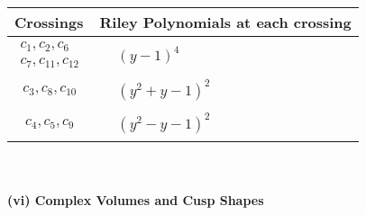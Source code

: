 \documentclass[1p]{elsarticle_modified}
\theoremstyle{definition}
\begin{document}
\begin{tabular}{m{50pt}|m{274pt}}
Crossings & \hspace{64pt}Riley Polynomials at each crossing \\
\hline $$\begin{aligned}c_{1},c_{2},c_{6}\\c_{7},c_{11},c_{12}\end{aligned}$$&$\begin{aligned}
&(y-1)^4
\end{aligned}$\\
\hline $$\begin{aligned}c_{3},c_{8},c_{10}\end{aligned}$$&$\begin{aligned}
&(y^2+y-1)^2
\end{aligned}$\\
\hline $$\begin{aligned}c_{4},c_{5},c_{9}\end{aligned}$$&$\begin{aligned}
&(y^2- y-1)^2
\end{aligned}$\\
\hline
\end{tabular}\\~\\
\newpage\flushleft \textbf{(vi) Complex Volumes and Cusp Shapes}
\end{document}
